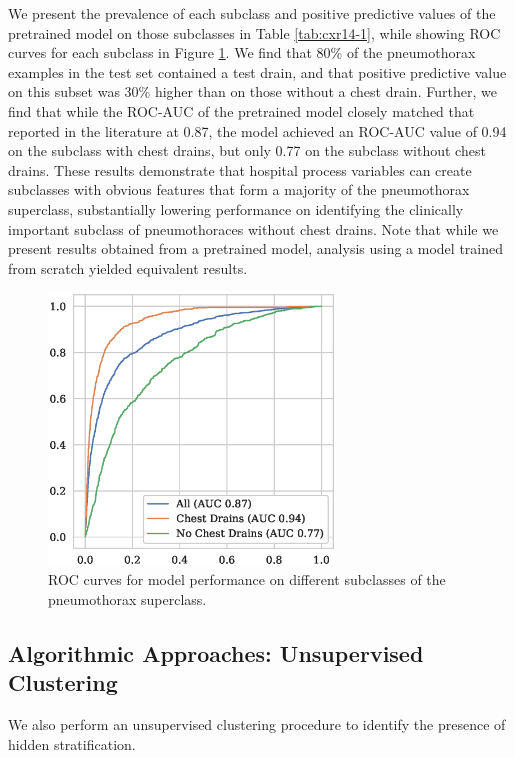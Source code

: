 \documentclass{article}
\begin{document}
 We present the prevalence of each subclass and positive predictive values of the pretrained model on those subclasses in Table \ref{tab:cxr14-1}, while showing ROC curves for each subclass in Figure \ref{fig:cxr14}.  
 We find that 80\% of the pneumothorax examples in the test set contained a test drain, and that positive predictive value on this subset was 30\% higher than on those without a chest drain.  
 Further, we find that while the ROC-AUC of the pretrained model closely matched that reported in the literature at 0.87, the model achieved an ROC-AUC value of 0.94 on the subclass with chest drains, but only 0.77 on the subclass without chest drains.  
 These results demonstrate that hospital process variables can create subclasses with obvious features that form a majority of the pneumothorax superclass, substantially lowering performance on identifying the clinically important subclass of pneumothoraces without chest drains.  
 Note that while we present results obtained from a pretrained model, analysis using a model trained from scratch yielded equivalent results. 
 \vspace{-4 mm}
 \begin{figure}[htb!]
 \centering
\includegraphics[width=3in]{Pneumo-ROC.eps}
\caption{ROC curves for model performance on different subclasses of the pneumothorax superclass.}
\label{fig:cxr14}
\vspace{- 2 mm}
\end{figure}

\subsection{Algorithmic Approaches: Unsupervised Clustering}

We also perform an unsupervised clustering procedure to identify the presence of hidden stratification.
\end{document}
